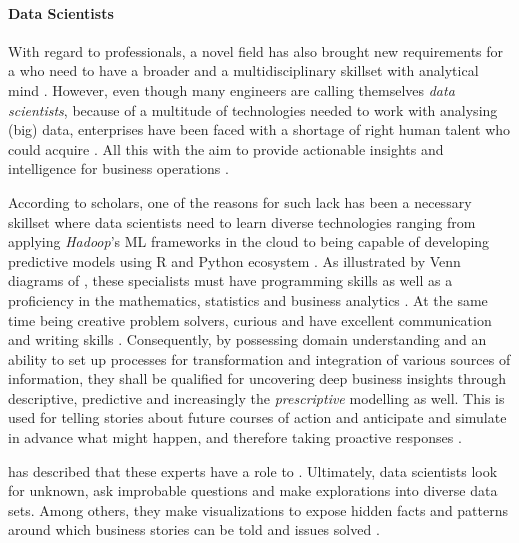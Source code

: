 \paragraph*{Data Scientists}
With regard to professionals, a novel field has also brought new requirements for a  who need to have a broader and a multidisciplinary skillset with analytical mind \parencites{JBL:JBL12010}[5]{Davenport2013Analytics3.0}{Provost201351}. 
However, even though many engineers are calling themselves \emph{data scientists}, because of a multitude of technologies needed to work with analysing (big) data, enterprises have been faced with a shortage of right human talent who could acquire  \parencite[73]{LongCao2016}.
All this with the aim to provide actionable insights and intelligence for business operations \parencites{Dichev2017TowardsLiteracy}{TeachingDS2016}.

According to scholars, one of the reasons for such lack has been a necessary skillset where data scientists need to learn diverse technologies ranging from applying \emph{Hadoop}'s \ac{ML} frameworks in the cloud to being capable of developing predictive models using R and Python ecosystem \parencites{Lara2015BigData}{CaoLong2017}.
As illustrated by Venn diagrams of \textcites{DrewConway2013TheDiagram}{Variousauthors2015WhatAnalyst}, these specialists must have programming skills as well as a proficiency in the mathematics, statistics and business analytics \parencites{loukides2011data}{Jifa2014DataScience}{Dhar:2013:DSP:2534706.2500499}.
At the same time being creative problem solvers, curious and have excellent communication and writing skills \parencites{Provost201351}{CaoLong2017}.
Consequently, by possessing domain understanding and an ability to set up processes for transformation and integration of various sources of information, they shall be qualified for uncovering deep business insights through descriptive, predictive and increasingly the \emph{prescriptive} modelling as well.
This is used for telling stories about future courses of action and anticipate and simulate in advance what might happen, and therefore taking proactive responses \parencite{CaoLong2017}.

\textcite[6]{JurneyRus2013} has described that these experts have a role to .
Ultimately, data scientists look for unknown, ask improbable questions and make explorations into diverse data sets. 
Among others, they make visualizations to expose  hidden facts and patterns around which business stories can be told and issues solved \parencite[6]{JurneyRus2013}.

